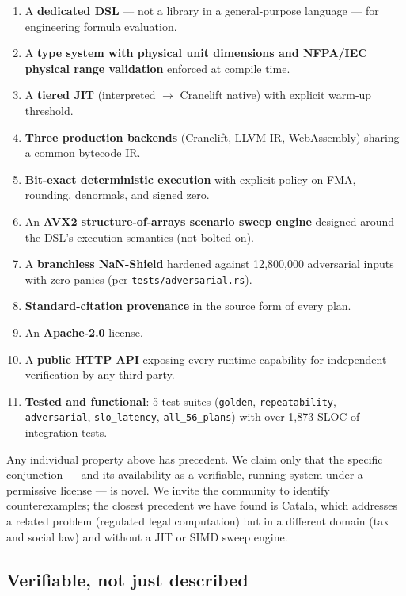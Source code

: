 \documentclass[11pt,a4paper]{article}
\begin{document}
\begin{enumerate}[leftmargin=*]
\item A \textbf{dedicated DSL} --- not a library in a general-purpose language --- for engineering formula evaluation.
\item A \textbf{type system with physical unit dimensions and NFPA/IEC physical range validation} enforced at compile time.
\item A \textbf{tiered JIT} (interpreted $\to$ Cranelift native) with explicit warm-up threshold.
\item \textbf{Three production backends} (Cranelift, LLVM IR, WebAssembly) sharing a common bytecode IR.
\item \textbf{Bit-exact deterministic execution} with explicit policy on FMA, rounding, denormals, and signed zero.
\item An \textbf{AVX2 structure-of-arrays scenario sweep engine} designed around the DSL's execution semantics (not bolted on).
\item A \textbf{branchless NaN-Shield} hardened against 12{,}800{,}000 adversarial inputs with zero panics (per \texttt{tests/adversarial.rs}).
\item \textbf{Standard-citation provenance} in the source form of every plan.
\item An \textbf{Apache-2.0} license.
\item A \textbf{public HTTP API} exposing every runtime capability for independent verification by any third party.
\item \textbf{Tested and functional}: 5 test suites (\texttt{golden}, \texttt{repeatability}, \texttt{adversarial}, \texttt{slo\_latency}, \texttt{all\_56\_plans}) with over 1{,}873 SLOC of integration tests.
\end{enumerate}

Any individual property above has precedent. We claim only that the specific conjunction --- and its availability as a verifiable, running system under a permissive license --- is novel. We invite the community to identify counterexamples; the closest precedent we have found is Catala, which addresses a related problem (regulated legal computation) but in a different domain (tax and social law) and without a JIT or SIMD sweep engine.

\subsection{Verifiable, not just described}
\end{document}
